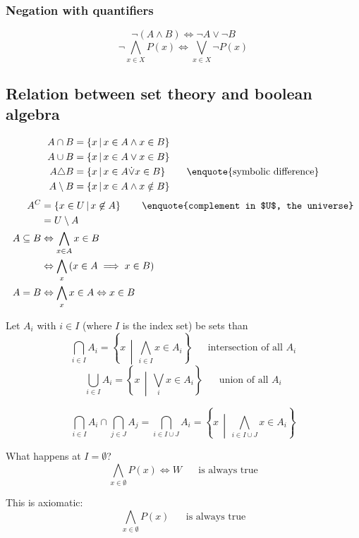 \documentclass[a4paper,landscape,twocolumn]{article}
\newcommand\setdef[2]{\left\{#1\,\middle|\,#2\right\}}
\newcommand\mathspace{\hspace{20pt}}
\begin{document}
\subsubsection{Negation with quantifiers}

\[ \neg(A \land B) \Leftrightarrow \neg A \lor \neg B \]
\[ \neg \bigwedge_{x \in X} P(x) \Leftrightarrow \bigvee_{x \in X} \neg P(x) \]

\subsection{Relation between set theory and boolean algebra}

\begin{align*}
  A \cap B &= \setdef{x}{x \in A \land x \in B} \\
  A \cup B &= \setdef{x}{x \in A \lor x \in B} \\
  A \triangle B &= \setdef{x}{x \in A \dot\lor x \in B} \mathspace \text{\enquote{symbolic difference}} \\
  A \setminus B &= \setdef{x}{x \in A \land x \notin B}
\end{align*}
\begin{align*}
  A^C &= \setdef{x \in U}{x \not\in A} \mathspace \text{\enquote{complement in $U$, the universe}} \\
      &= U \setminus A \\
  A \subseteq B &\Leftrightarrow \bigwedge_{x \in A} x \in B \\
                &\Leftrightarrow \bigwedge_{x} \left(x \in A \implies x \in B\right) \\
  A = B &\Leftrightarrow \bigwedge_x x \in A \Leftrightarrow x \in B
\end{align*}

Let $A_i$ with $i \in I$ (where $I$ is the index set) be sets than
\[ \bigcap_{i \in I} A_i = \setdef{x}{\bigwedge_{i \in I} x \in A_i} \mathspace \text{intersection of all $A_i$} \]
\[ \bigcup_{i \in I} A_i = \setdef{x}{\bigvee_i x \in A_i} \mathspace \text{union of all $A_i$} \]

\[
    \bigcap_{i \in I} A_i \cap \bigcap_{j \in J} A_j
    = \bigcap_{i \in I \cup J} A_i
    = \setdef{x}{\bigwedge_{i \in I \cup J} x \in A_i}
\]

What happens at $I = \emptyset$?
\[ \bigwedge_{x \in \emptyset} P(x) \Leftrightarrow W \mathspace\text{is always true} \]

This is axiomatic:
\[ \bigwedge_{x \in \emptyset} P(x) \mathspace \text{is always true} \]
\end{document}
